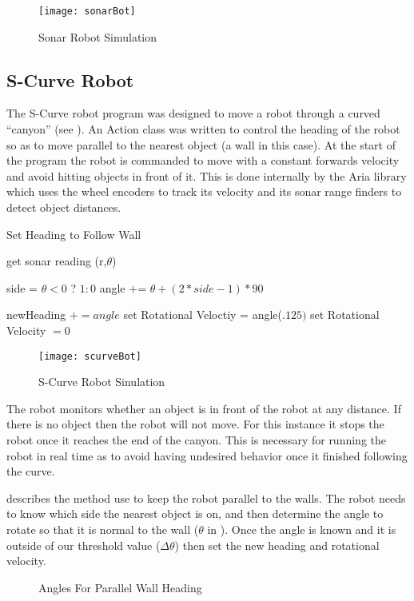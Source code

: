 \documentclass[main.tex]{subfiles}
\begin{document}
\begin{figure}[H]
\begin{center}
\texttt{[image: sonarBot]}
\end{center}
\caption{Sonar Robot Simulation}
\label{fig:sonarSim}
\end{figure}

\subsection{S-Curve Robot}

The S-Curve robot program was designed to move a robot through a curved
``canyon'' (see ). An Action class was written to control the
heading of the robot so as to move parallel to the nearest object (a wall in
this case). At the start of the program the robot is commanded to move with a
constant forwards velocity and avoid hitting objects in front of it. This is
done internally by the Aria library which uses the wheel encoders to track its
velocity and its sonar range finders to detect object distances.

\begin{algorithm}
\caption{Set Heading to Follow Wall}
\label{al:folWall}
\begin{algorithmic}
\STATE get sonar reading (r,$\theta$)

\STATE side = $\theta < 0$ ? $1 : 0$
\STATE angle += $\theta + (2*side-1)*90$

	\STATE newHeading $+= angle$
	\STATE set Rotational Veloctiy = angle($.125)$
\ELSE 
	\STATE set Rotational Velocity $= 0$
\ENDIF

\end{algorithmic}
\end{algorithm}

\begin{figure}[H]
\begin{center}
\texttt{[image: scurveBot]}
\end{center}
\caption{S-Curve Robot Sinulation}
\label{fig:scurveSim}
\end{figure}


The robot monitors whether an object is in front of the robot at any distance.
If there is no object then the robot will not move. For this instance it stops
the robot once it reaches the end of the canyon. This is necessary for running
the robot in real time as to avoid having undesired behavior once it finished
following the curve. 

 describes the method use to keep the robot parallel to the
walls. The robot needs to know which side the nearest object is on, and then
determine the angle to rotate so that it is normal to the wall ($\theta$ in
). Once the angle is known and it is outside of our threshold
value ($\Delta\theta$) then set the new heading and rotational velocity.

\begin{figure}[H]
\begin{center}

\end{center}
\caption{Angles For Parallel Wall Heading}
\label{fig:prWall}
\end{figure}
\end{document}
